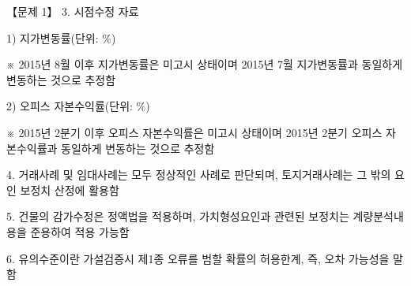\begin{longquestion}{【문제 1】}
3. 시점수정 자료 \par
1) 지가변동률(단위: \%) \par
{\small\centering
{}\par}

※ 2015년 8월 이후 지가변동률은 미고시 상태이며 2015년 7월 지가변동률과 동일하게 변동하는 것으로 추정함 \par
2) 오피스 자본수익률(단위: \%) \par
{\small\centering
{}\par}

※ 2015년 2분기 이후 오피스 자본수익률은 미고시 상태이며 2015년 2분기 오피스 자본수익률과 동일하게 변동하는 것으로 추정함 \par
4. 거래사례 및 임대사례는 모두 정상적인 사례로 판단되며, 토지거래사례는 그 밖의 요인 보정치 산정에 활용함 \par
5. 건물의 감가수정은 정액법을 적용하며, 가치형성요인과 관련된 보정치는 계량분석내용을 준용하여 적용 가능함 \par
6. 유의수준이란 가설검증시 제1종 오류를 범할 확률의 허용한계, 즉, 오차 가능성을 말함 \par
\end{longquestion}
